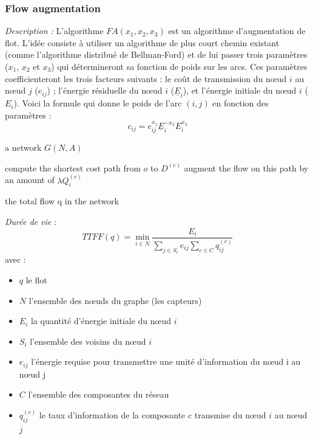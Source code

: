 \subsubsection{Flow augmentation \cite{Chang2000}}

\emph{Description :}
L'algorithme $FA(x_1, x_2, x_3)$ est un algorithme d'augmentation de flot. L'idée consiste à utiliser un algorithme de plus court chemin existant (comme l'algorithme distribué de Bellman-Ford) et de lui passer trois paramètres ($x_1$, $x_2$ et $x_3$) qui détermineront sa fonction de poids sur les arcs. Ces paramètres coefficienteront les trois facteurs suivants : le coût de transmission du nœud $i$ au nœud $j$ ($e_{ij}$) ; l'énergie résiduelle du nœud $i$ ($\underline{E}_i$), et l'énergie initiale du nœud $i$ ($E_i$). Voici la formule qui donne le poids de l'arc $(i,j)$ en fonction des paramètres :
\begin{displaymath}
c_{ij} = e_{ij}^{x_1} \underline{E}_i^{-x_2} E_i^{x_3}
\end{displaymath}

\begin{algorithm}[H]
\caption{$FA(x_1,x_2,x_3)$}
\label{algo_FA}
\begin{algorithmic}
\REQUIRE a network $ G(N,A) $

			\STATE compute the shortest cost path from $o$ to $D^{(c)}$
			\STATE augment the flow on this path by an amount of $\lambda Q_i^{(c)}$
		\ENDFOR
	\ENDFOR
\ENDWHILE

\RETURN the total flow q in the network
\end{algorithmic}
\end{algorithm}


\emph{Durée de vie} :  $$TTFF(q) = \min\limits_{i \in N}\frac{E_i}{\sum \limits_{j \in S_i} {e_{ij}} \sum \limits_{c \in C} {q_{ij}^{(c)}}}$$
avec :
\begin{itemize}
\item $q$ le flot
\item $N$ l'ensemble des nœuds du graphe (les capteurs)
\item $E_i$ la quantité d'énergie initiale du nœud $i$
\item $S_i$ l'ensemble des voisins du nœud $i$
\item $e_{ij}$ l'énergie requise pour transmettre une unité d'information du nœud i au nœud j
\item $C$ l'ensemble des composantes du réseau
\item $q_{ij}^{(c)}$ le taux d'information de la composante c transmise du nœud $i$ au nœud $j$
\end{itemize}



